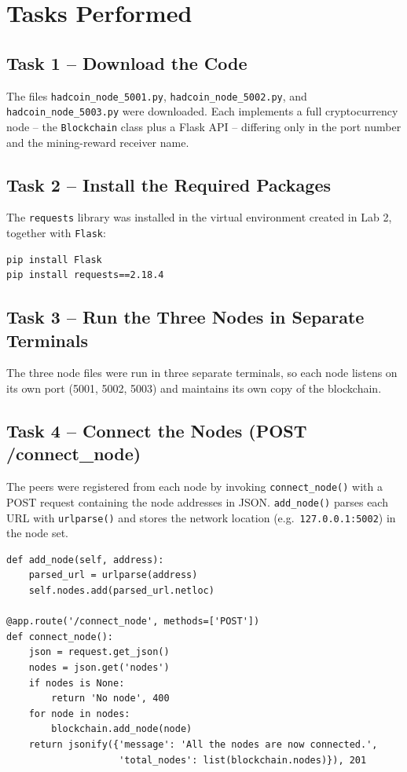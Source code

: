 \documentclass[12pt,a4paper]{article}
\begin{document}
\section{Tasks Performed}

\subsection{Task 1 -- Download the Code}
The files \texttt{hadcoin\_node\_5001.py}, \texttt{hadcoin\_node\_5002.py}, and \texttt{hadcoin\_node\_5003.py} were downloaded. Each implements a full cryptocurrency node -- the \texttt{Blockchain} class plus a Flask API -- differing only in the port number and the mining-reward receiver name.

\subsection{Task 2 -- Install the Required Packages}
The \texttt{requests} library was installed in the virtual environment created in Lab 2, together with \texttt{Flask}:
{\renewcommand{\baselinestretch}{0.85}\selectfont
\begin{lstlisting}[style=pythonstyle, numbers=none]
pip install Flask
pip install requests==2.18.4
\end{lstlisting}
}

\subsection{Task 3 -- Run the Three Nodes in Separate Terminals}
The three node files were run in three separate terminals, so each node listens on its own port (5001, 5002, 5003) and maintains its own copy of the blockchain.

\subsection{Task 4 -- Connect the Nodes (POST /connect\_node)}
The peers were registered from each node by invoking \texttt{connect\_node()} with a POST request containing the node addresses in JSON. \texttt{add\_node()} parses each URL with \texttt{urlparse()} and stores the network location (e.g.\ \texttt{127.0.0.1:5002}) in the node set.

{\renewcommand{\baselinestretch}{0.85}\selectfont
\begin{lstlisting}[style=pythonstyle]
def add_node(self, address):
    parsed_url = urlparse(address)
    self.nodes.add(parsed_url.netloc)

@app.route('/connect_node', methods=['POST'])
def connect_node():
    json = request.get_json()
    nodes = json.get('nodes')
    if nodes is None:
        return 'No node', 400
    for node in nodes:
        blockchain.add_node(node)
    return jsonify({'message': 'All the nodes are now connected.',
                    'total_nodes': list(blockchain.nodes)}), 201
\end{lstlisting}
}
\end{document}
